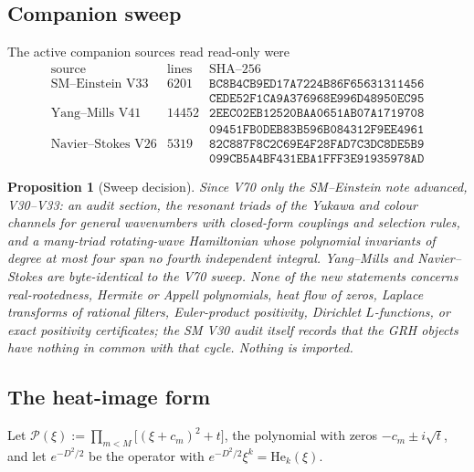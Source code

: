 \documentclass[11pt]{article}
\newtheorem{proposition}[theorem]{Proposition}
\theoremstyle{definition}
\theoremstyle{remark}
\begin{document}
\subsection{Companion sweep}

The active companion sources read read-only were
\begin{equation}
\begin{array}{c|r|l}
\text{source}&\text{lines}&\text{SHA--256}\\ \hline
\text{SM--Einstein V33}&6201&
\texttt{BC8B4CB9ED17A7224B86F65631311456}\\
&&\texttt{CEDE52F1CA9A376968E996D48950EC95}\\
\text{Yang--Mills V41}&14452&
\texttt{2EEC02EB12520BAA0651AB07A1719708}\\
&&\texttt{09451FB0DEB83B596B084312F9EE4961}\\
\text{Navier--Stokes V26}&5319&
\texttt{82C887F8C2C69E4F28FAD7C3DC8DE5B9}\\
&&\texttt{099CB5A4BF431EBA1FFF3E91935978AD}
\end{array}
\label{eq:f2v75-sources}
\end{equation}

\begin{proposition}[Sweep decision]
\label{prop:f2v75-sweep}
Since V70 only the SM--Einstein note advanced, V30--V33: an audit
section, the resonant triads of the Yukawa and colour channels for
general wavenumbers with closed-form couplings and selection rules, and
a many-triad rotating-wave Hamiltonian whose polynomial invariants of
degree at most four span no fourth independent integral.  Yang--Mills
and Navier--Stokes are byte-identical to the V70 sweep.  None of the new
statements concerns real-rootedness, Hermite or Appell polynomials, heat
flow of zeros, Laplace transforms of rational filters, Euler-product
positivity, Dirichlet \(L\)-functions, or exact positivity certificates;
the SM V30 audit itself records that the GRH objects have nothing in
common with that cycle.  Nothing is imported.
\end{proposition}


\subsection{The heat-image form}

Let \(\mathcal P(\xi):=\prod_{m<M}\bigl[(\xi+c_m)^2+t\bigr]\), the
polynomial with zeros \(-c_m\pm i\sqrt t\), and let \(e^{-D^2/2}\) be the
operator with \(e^{-D^2/2}\xi^k=\mathrm{He}_k(\xi)\).
\end{document}
